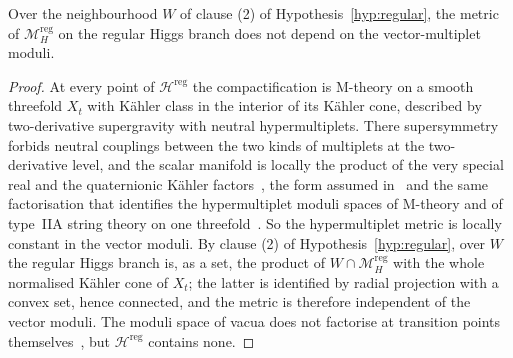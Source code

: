 \begin{lemma}\label{lem:product}
Over the neighbourhood $W$ of clause (2) of Hypothesis~\ref{hyp:regular}, the metric of
$\mathcal M_H^{\mathrm{reg}}$ on the regular Higgs branch does not depend on the vector-multiplet
moduli.
\end{lemma}

\begin{proof}
At every point of $\mathcal H^{\mathrm{reg}}$ the compactification is M-theory on a smooth
threefold $X_t$ with K\"ahler class in the interior of its K\"ahler cone, described by
two-derivative supergravity with neutral hypermultiplets. There supersymmetry forbids neutral
couplings between the two kinds of multiplets at the two-derivative level, and the scalar
manifold is locally the product of the very special real and the quaternionic K\"ahler
factors~\cite[Sect.~2.4]{Becker:1995kb}, the form assumed in~\cite{Ceresole:2000} and the same
factorisation that identifies the hypermultiplet moduli spaces of M-theory and of type~IIA string
theory on one threefold~\cite[Sect.~2]{Strominger:1997}. So the hypermultiplet metric is locally
constant in the vector moduli. By clause (2) of Hypothesis~\ref{hyp:regular}, over $W$ the
regular Higgs branch is, as a set, the product of $W\cap\mathcal M_H^{\mathrm{reg}}$ with the
whole normalised K\"ahler cone of $X_t$; the latter is identified by radial projection with a convex set, hence
connected, and the metric is therefore independent of the vector moduli. The moduli space of
vacua does not factorise at transition points themselves~\cite[Sect.~2.1]{Aspinwall:2000}, but
$\mathcal H^{\mathrm{reg}}$ contains none.
\end{proof}
